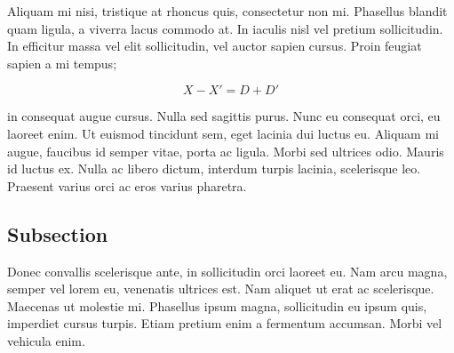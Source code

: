 \documentclass[../main.tex]{subfiles}
\begin{document}
Aliquam mi nisi, tristique at rhoncus quis, consectetur non mi. Phasellus blandit quam ligula, a viverra lacus commodo at. In iaculis nisl vel pretium sollicitudin. In efficitur massa vel elit sollicitudin, vel auctor sapien cursus. Proin feugiat sapien a mi tempus;

\begin{equation}
    X-X'=D+D'
\end{equation}
 
 
\noindent in consequat augue cursus. Nulla sed sagittis purus. Nunc eu consequat orci, eu laoreet enim. Ut euismod tincidunt sem, eget lacinia dui luctus eu. Aliquam mi augue, faucibus id semper vitae, porta ac ligula. Morbi sed ultrices odio. Mauris id luctus ex. Nulla ac libero dictum, interdum turpis lacinia, scelerisque leo. Praesent varius orci ac eros varius pharetra.


\subsection{Subsection}
Donec convallis scelerisque ante, in sollicitudin orci laoreet eu. Nam arcu magna, semper vel lorem eu, venenatis ultrices est. Nam aliquet ut erat ac scelerisque. Maecenas ut molestie mi. Phasellus ipsum magna, sollicitudin eu ipsum quis, imperdiet cursus turpis. Etiam pretium enim a fermentum accumsan. Morbi vel vehicula enim.
\end{document}

